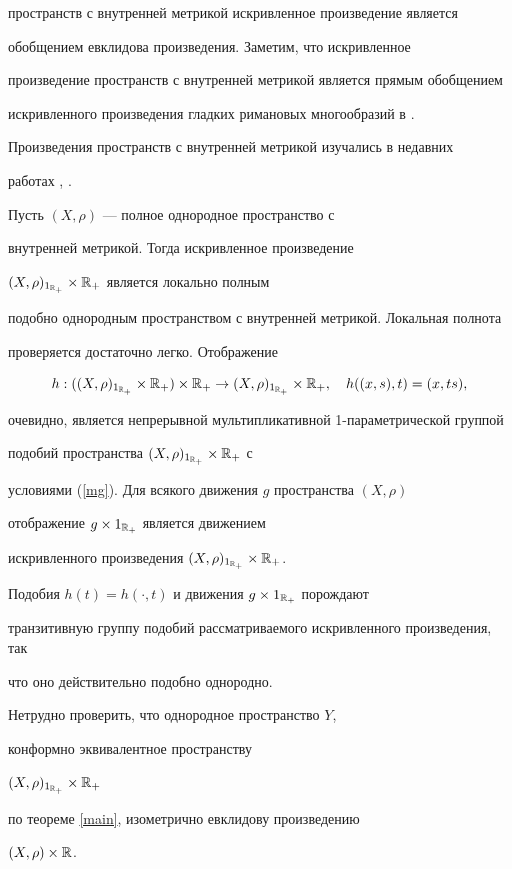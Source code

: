 пространств с внутренней метрикой искривленное произведение является


обобщением евклидова произведения. Заметим, что искривленное


произведение пространств с внутренней метрикой является прямым обобщением


искривленного произведения гладких римановых многообразий в \cite{BON}.


Произведения пространств с внутренней метрикой изучались в недавних


работах \cite{BFS}, \cite{FS}.





\begin{exams}


\label{ex6}


Пусть $(X,\rho)$ --- полное однородное пространство с


внутренней метрикой. Тогда искривленное произведение


$(X,\rho)_{1_{\Bbb{R}_{+} }} \times \Bbb{R}_{+}$ является локально полным


подобно однородным пространством с внутренней метрикой. Локальная полнота


проверяется достаточно легко. Отображение


$$h: ((X,\rho)_{1_{\Bbb{R}_{+}}} \times \Bbb{R}_{+}) \times


\Bbb{R}_{+} \rightarrow (X,\rho)_{1_{\Bbb{R}_{+}}} \times \Bbb{R}_{+},


\quad h((x,s),t)= (x,ts),


$$


очевидно, является непрерывной мультипликативной 1-параметрической группой


подобий пространства $(X,\rho)_{1_{\Bbb{R}_{+}}} \times \Bbb{R}_{+}$ с


условиями (\ref{mg}). Для всякого движения $g$ пространства $(X,\rho)$


отображение $g \times 1_{\Bbb{R}_{+}}$ является движением


искривленного произведения $(X,\rho)_{1_{\Bbb{R}_{+}}} \times \Bbb{R}_{+}$.


Подобия $h(t)=h(\cdot,t)$ и движения $g \times 1_{\Bbb{R}_{+}}$ порождают


транзитивную группу подобий рассматриваемого искривленного произведения, так


что оно действительно подобно однородно.





Нетрудно проверить, что однородное пространство $Y$,


конформно эквивалентное пространству


$(X,\rho)_{1_{\Bbb{R}_{+} }} \times \Bbb{R}_{+}$


по теореме \ref{main}, изометрично евклидову произведению


$(X,\rho) \times \Bbb{R}$.


\end{exams}






